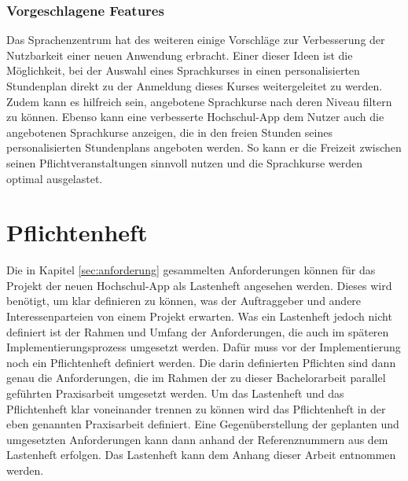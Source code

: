 \subsubsection{Vorgeschlagene Features}

Das Sprachenzentrum hat des weiteren einige Vorschläge zur Verbesserung der Nutzbarkeit einer neuen Anwendung erbracht. 
Einer dieser Ideen ist die Möglichkeit, bei der Auswahl eines Sprachkurses in einen personalisierten Stundenplan direkt zu der Anmeldung dieses Kurses weitergeleitet zu werden.
Zudem kann es hilfreich sein, angebotene Sprachkurse nach deren Niveau filtern zu können.
Ebenso kann eine verbesserte Hochschul-\ac{App} dem Nutzer auch die angebotenen Sprachkurse anzeigen, die in den freien Stunden seines personalisierten Stundenplans angeboten werden. So kann er die Freizeit zwischen seinen Pflichtveranstaltungen sinnvoll nutzen und die Sprachkurse werden optimal ausgelastet.

\section{Pflichtenheft\label{sec:pfilchtenheft}}

Die in Kapitel \ref{sec:anforderung} gesammelten Anforderungen können für das Projekt der neuen Hoch\-schul-\ac{App} als Lastenheft angesehen werden. Dieses wird benötigt, um klar definieren zu können, was der Auftraggeber und andere Interessenparteien von einem Projekt erwarten. Was ein Lastenheft jedoch nicht definiert ist der Rahmen und Umfang der Anforderungen, die auch im späteren Implementierungsprozess umgesetzt werden. Dafür muss vor der Implementierung noch ein Pflichtenheft definiert werden. Die darin definierten Pflichten sind dann genau die Anforderungen, die im Rahmen der zu dieser Bachelorarbeit parallel geführten Praxisarbeit umgesetzt werden\autocite[Vgl.][]{dnpa}. Um das Lastenheft und das Pflichtenheft klar voneinander trennen zu können wird das Pflichtenheft in der eben genannten Praxisarbeit definiert. Eine Gegenüberstellung der geplanten und umgesetzten Anforderungen kann dann anhand der Referenznummern  aus dem Lastenheft erfolgen. Das Lastenheft kann dem Anhang dieser Arbeit entnommen werden.
